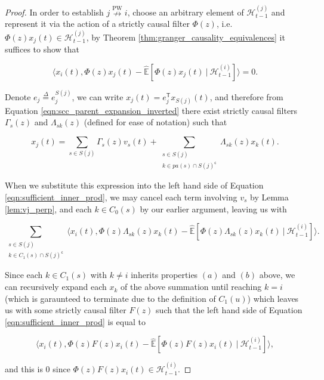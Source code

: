 \documentclass{statsoc}
\newcounter{definition}
\def\npwgc{\overset{\text{PW}}{\nrightarrow}}  %
\def\H{\mathcal{H}}  %
\newcommand{\linE}[2]{\hat{\E}[#1\ |\ #2]}  %
\newcommand{\pa}[1]{pa(#1)}  %
\def\defeq{\overset{\Delta}{=}}  %
\def\H{\mathcal{H}}  %
\def\E{\mathbb{E}}  %
\def\T{\mathsf{T}}  %
\def\c{\mathsf{c}}  %
\newcommand{\inner}[2]{\langle #1, #2 \rangle}  %
\begin{document}
\begin{proof}
  In order to establish $j \npwgc i$, choose an arbitrary element of
  $\H_{t - 1}^{(j)}$ and represent it via the action of a strictly causal
  filter $\Phi(z)$, i.e.  $\Phi(z) x_j(t) \in \H_{t - 1}^{(j)}$, by
  Theorem \ref{thm:granger_causality_equivalences} it suffices to show
  that

  \begin{equation}
    \label{eqn:sufficient_inner_prod}
    \inner{x_i(t)}{\Phi(z)x_j(t) - \linE{\Phi(z)x_j(t)}{\H_{t - 1}^{(i)}}} = 0.
  \end{equation}

  Denote $e_j \defeq e_j^{S(j)}$, we can write
  $x_j(t) = e_j^\T x_{S(j)}(t)$, and therefore from Equation
  \eqref{eqn:scc_parent_expansion_inverted} there exist strictly
  causal filters $\Gamma_s(z)$ and $\Lambda_{sk}(z)$ (defined for ease
  of notation) such that

  \[
    x_j(t) = \sum_{s \in S(j)} \Gamma_s(z)v_s(t) + \sum_{\substack{s \in S(j) \\ k \in \pa{s} \cap S(j)^\c}} \Lambda_{sk}(z)x_k(t).
  \]

  When we substitute this expression into the left hand side of
  Equation \eqref{eqn:sufficient_inner_prod}, we may cancel each term
  involving $v_s$ by Lemma \ref{lem:vj_perp}, and each $k \in C_0(s)$
  by our earlier argument, leaving us with

  \[
    \sum_{\substack{s \in S(j) \\ k \in C_1(s) \cap S(j)^\c}}\inner{x_i(t)}{\Phi(z)\Lambda_{sk}(z)x_k(t) - \linE{\Phi(z)\Lambda_{sk}(z)x_k(t)}{\H_{t - 1}^{(i)}}}.
  \]

  Since each $k \in C_1(s)$ with $k \ne i$ inherits properties $(a)$
  and $(b)$ above, we can recursively expand each $x_k$ of the above
  summation until reaching $k = i$ (which is garaunteed to terminate
  due to the definition of $C_1(u)$) which leaves us with some
  strictly causal filter $F(z)$ such that the left hand side of
  Equation \eqref{eqn:sufficient_inner_prod} is equal to

  \[
    \inner{x_i(t)}{\Phi(z)F(z)x_i(t) - \linE{\Phi(z)F(z)x_i(t)}{\H_{t - 1}^{(i)}}},
  \]

  and this is $0$ since $\Phi(z)F(z)x_i(t) \in \H_{t - 1}^{(i)}$.
  



\end{proof}
\end{document}
